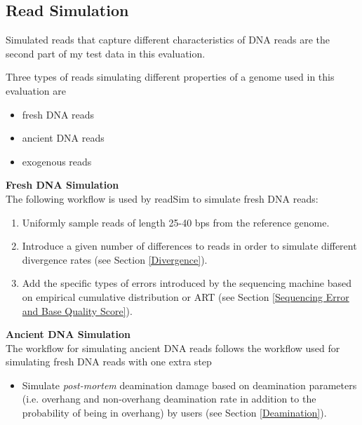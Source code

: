 \documentclass[11pt,a4paper]{report}
\begin{document}


\subsection{Read Simulation} \label{Read Simulation}

Simulated reads that capture different characteristics of DNA reads are the 
second part of my test data in this evaluation.

Three types of reads simulating different properties of a genome used in this
 evaluation are

\begin{itemize}
	\item fresh DNA reads
	\item ancient DNA reads
	\item exogenous reads
\end{itemize}

\textbf{Fresh DNA Simulation}\\

The following workflow is used by readSim to simulate fresh DNA
 reads:

\begin{enumerate}
 \item Uniformly sample reads of length 25-40 bps from the reference genome.

 \item Introduce a given number of differences to 
 reads in order to simulate different divergence rates
 (see Section \ref{Divergence}).

 \item Add the specific types of errors introduced by the sequencing 
 machine based on empirical cumulative distribution or ART\cite{art} 
 (see Section \ref{Sequencing Error and Base Quality Score}).
\end{enumerate}


\textbf{Ancient DNA Simulation} \\

The workflow for simulating ancient DNA reads follows the workflow used for 
simulating fresh DNA reads with one extra step

\begin{itemize}
 
\item Simulate \emph{post-mortem} deamination damage based on 
deamination parameters (i.e. overhang and non-overhang deamination 
rate in addition to the probability of being in overhang) by users
(see Section \ref{Deamination}). 

\end{itemize}
\end{document}
